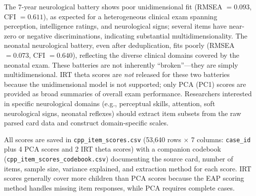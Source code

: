 \documentclass[12pt]{article}
\begin{document}
The 7-year neurological battery shows poor unidimensional fit (RMSEA $= 0.093$, CFI $= 0.611$), as expected for a heterogeneous clinical exam spanning perception, intelligence ratings, and neurological signs; several items have near-zero or negative discriminations, indicating substantial multidimensionality. The neonatal neurological battery, even after deduplication, fits poorly (RMSEA $= 0.073$, CFI $= 0.640$), reflecting the diverse clinical domains covered by the neonatal exam. These batteries are not inherently ``broken''---they are simply multidimensional. IRT theta scores are \textit{not} released for these two batteries because the unidimensional model is not supported; only PCA (PC1) scores are provided as broad summaries of overall exam performance. Researchers interested in specific neurological domains (e.g., perceptual skills, attention, soft neurological signs, neonatal reflexes) should extract item subsets from the raw parsed card data and construct domain-specific scales.

All scores are saved in \texttt{cpp\_item\_scores.csv} (53,640 rows $\times$ 7 columns: \texttt{case\_id} plus 4 PCA scores and 2 IRT theta scores) with a companion codebook (\texttt{cpp\_item\_scores\_codebook.csv}) documenting the source card, number of items, sample size, variance explained, and extraction method for each score. IRT scores generally cover more children than PCA scores because the EAP scoring method handles missing item responses, while PCA requires complete cases.
\end{document}
